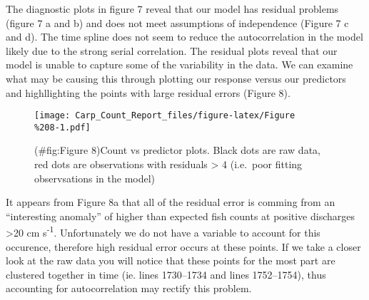 \documentclass[]{article}
\begin{document}
The diagnostic plots in figure 7 reveal that our model has residual
problems (figure 7 a and b) and does not meet assumptions of
independence (Figure 7 c and d). The time spline does not seem to reduce
the autocorrelation in the model likely due to the strong serial
correlation. The residual plots reveal that our model is unable to
capture some of the variability in the data. We can examine what may be
causing this through plotting our response versus our predictors and
highllighting the points with large residual errors (Figure 8).

\begin{figure}[htbp]
\centering
\texttt{[image: Carp\_Count\_Report\_files/figure-latex/Figure\\\%208-1.pdf]}
\caption{(\#fig:Figure 8)Count vs predictor plots. Black dots are raw
data, red dots are observations with residuals \textgreater{} 4
(i.e.~poor fitting observsations in the model)}
\end{figure}

It appears from Figure 8a that all of the residual error is comming from
an ``interesting anomaly'' of higher than expected fish counts at
positive discharges \textgreater{}20 cm s\textsuperscript{-1}.
Unfortunately we do not have a variable to account for this occurence,
therefore high residual error occurs at these points. If we take a
closer look at the raw data you will notice that these points for the
most part are clustered together in time (ie. lines 1730--1734 and lines
1752--1754), thus accounting for autocorrelation may rectify this
problem.
\end{document}
